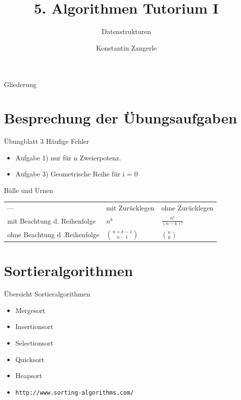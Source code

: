 \documentclass[18pt]{beamer}
\title[Algo I Tut]{5. Algorithmen Tutorium I}
\subtitle{Datenstrukturen}
\author[Zangerle]{Konstantin Zangerle}
\institute{Institut für Theoretische Informatik}
\begin{document}

\begin{frame}
\titlepage
\end{frame}

\begin{frame}{Gliederung}
 \tableofcontents
\end{frame}


\section{Besprechung der Übungsaufgaben}
\begin{frame}{Übungblatt 3}
Häufige Fehler
\begin{itemize}
 \item Aufgabe 1) nur für n Zweierpotenz.
 \item Aufgabe 3) Geometrische Reihe für i = 0 
\end{itemize}
\end{frame}


\begin{frame}{Bälle und Urnen}
 \begin{tabular}{lll}
  --- 				&	mit Zurücklegen 	& ohne Zurücklegen 	\\
 mit Beachtung d. Reihenfolge  	& 	$n^k$			& $\frac{n!}{(n-k)!}$	\\
 ohne Beachtung d .Reihenfolge 	& 	$\binom{n+k-1}{n-1}$	& $\binom{n}{k}$
 \end{tabular}

\end{frame}

\section{Sortieralgorithmen}
\begin{frame}[fragile]{Übersicht Sortieralgorithmen}
 \begin{itemize}
  \item Mergesort
  \item Insertionsort
  \item Selectionsort
  \item Quicksort
  \item Heapsort
  \item \verb|http://www.sorting-algorithms.com/|
 \end{itemize}

\end{frame}
\end{document}

